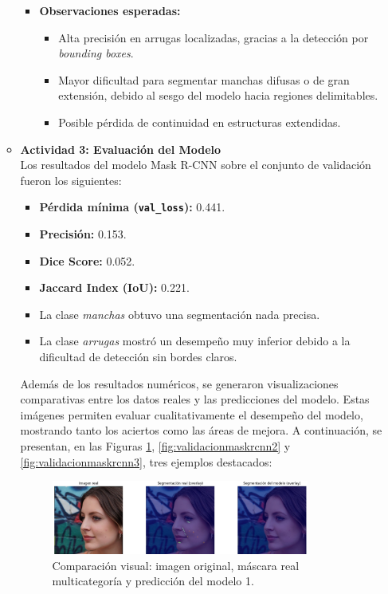 \begin{enumerate}
\begin{itemize}
\begin{itemize}
      \item \textbf{Observaciones esperadas:}
      \begin{itemize}
        \item Alta precisión en arrugas localizadas, gracias a la detección por \emph{bounding boxes}.
        \item Mayor dificultad para segmentar manchas difusas o de gran extensión, debido al sesgo del modelo hacia regiones delimitables.
        \item Posible pérdida de continuidad en estructuras extendidas.
      \end{itemize}
    \end{itemize}
  
    \item \textbf{Actividad 3: Evaluación del Modelo} \\
    Los resultados del modelo Mask R-CNN sobre el conjunto de validación fueron los siguientes:
    \begin{itemize}
      \item \textbf{Pérdida mínima (\texttt{val\_loss}):} 0.441.
      \item \textbf{Precisión:} 0.153.
      \item \textbf{Dice Score:} 0.052.
      \item \textbf{Jaccard Index (IoU):} 0.221.
      \item La clase \emph{manchas} obtuvo una segmentación nada precisa.
      \item La clase \emph{arrugas} mostró un desempeño muy inferior debido a la dificultad de detección sin bordes claros.
    \end{itemize}
  
    Además de los resultados numéricos, se generaron visualizaciones comparativas entre los datos reales y las predicciones del modelo. Estas imágenes permiten evaluar cualitativamente el desempeño del modelo, mostrando tanto los aciertos como las áreas de mejora. A continuación, se presentan, en las Figuras \ref{fig:validacionmaskrcnn1}, \ref{fig:validacionmaskrcnn2} y \ref{fig:validacionmaskrcnn3}, tres ejemplos destacados:
  
    \vspace{0.5cm}
  
    \begin{figure}[H]
      \centering
      \includegraphics[width=0.85\textwidth]{4/figures/maskrcnn1.png}
      \caption{Comparación visual: imagen original, máscara real multicategoría y predicción del modelo 1.}
      \label{fig:validacionmaskrcnn1}
    \end{figure}
  

\end{itemize}
\end{enumerate}
